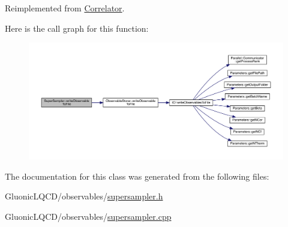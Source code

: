 Reimplemented from \mbox{\hyperlink{class_correlator_a9e8d80e30e4fbe3b7fe57521538cb5ff}{Correlator}}.

Here is the call graph for this function\+:
\nopagebreak
\begin{figure}[H]
\begin{center}
\leavevmode
\includegraphics[width=350pt]{class_super_sampler_a05b42b82879233dc329d280a61bfd7f0_cgraph}
\end{center}
\end{figure}


The documentation for this class was generated from the following files\+:\begin{DoxyCompactItemize}
\item 
Gluonic\+L\+Q\+C\+D/observables/\mbox{\hyperlink{supersampler_8h}{supersampler.\+h}}\item 
Gluonic\+L\+Q\+C\+D/observables/\mbox{\hyperlink{supersampler_8cpp}{supersampler.\+cpp}}\end{DoxyCompactItemize}
